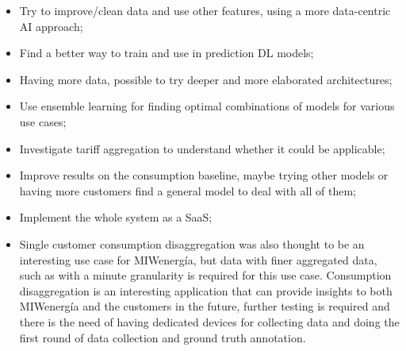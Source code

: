 \begin{itemize}
  \item Try to improve/clean data and use other features, using a more data-centric AI approach;
  \item Find a better way to train and use in prediction DL models;
  \item Having more data, possible to try deeper and more elaborated architectures;
  \item Use ensemble learning for finding optimal combinations of models for various use cases;
  \item Investigate tariff aggregation to understand whether it could be applicable;
  \item Improve results on the consumption baseline, maybe trying other models or having more customers find a general model to deal with all of them;
  \item Implement the whole system as a SaaS;
  \item Single customer consumption disaggregation was also thought to be an interesting use case for MIWenergía, but data with finer aggregated data, such as with a minute granularity is required for this use case. Consumption disaggregation is an interesting application that can provide insights to both MIWenergía and the customers in the future, further testing is required and there is the need of having dedicated devices for collecting data and doing the first round of data collection and ground truth annotation.
\end{itemize}


